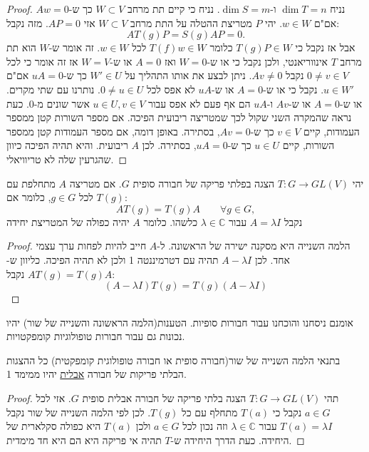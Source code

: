 \documentclass{tstextbook}
\begin{document}
\begin{proof}
נניח \(\dim T=n\) ו-\(\dim S = m\). נניח כי קיים תת מרחב \(W\subset V\) כך ש-\(Aw=0\) אם"ם \(w \in W\). יהי \(P\) מטריצת ההטלה על התת מרחב \(W\subset V\) אזי \(AP=0\). מזה נקבל:
$$A T(g)P=S(g)A P=0.$$
אבל אז נקבל כי \(T(g)P \in W\) כלומר \(T(f)w \in W\) לכל \(w \in W\). זה אומר ש-\(W\) הוא תת מרחב \(T\) אינווריאנטי, ולכן נקבל כי או ש-\(W=0\) ואז \(A=0\) או ש-\(W=V\) אז זה אומר כי לכל \(0 \neq v \in V\) נקבל \(Av \neq 0\).
ניתן לבצע את אותו התהליך על \(W' \in U\) כך ש-\(uA=0\) אם"ם \(u \in W'\). נקבל כי או ש-\(A=0\) או ש-\(uA\) לא אפס לכל \(0\neq u \in U\).
נותרנו עם שתי מקרים. או ש-\(A=0\) או ש-\(Av\) ו-\(uA\) הם אף פעם לא אפס עבור \(u\in U, v\in V\) אשר שונים מ-0. כעת נראה שהמקרה השני שקול לכך שמטריצה ריבועית הפיכה. אם מספר השורות קטן ממספר העמודות, קיים \(v \in V\) כך ש-\(Av=0\), בסתירה. באופן דומה, אם מספר העמודות קטן ממספר השורות, קיים \(u \in U\) כך ש-\(uA=0\), בסתירה. לכן \(A\) ריבועית. והיא תהיה הפיכה כיוון שהגרעין שלה לא טריוויאלי.

\end{proof}
\begin{lemma}
יהי \(T:G\to GL(V)\) הצגה בפלתי פריקה של חבורה סופית \(G\). אם מטריצה \(A\) מתחלפת עם \(T(g)\) לכל \(g \in G\), כלומר אם:
$$A T(g)=T(g)A\qquad\forall g\in G,$$
נקבל \(A=\lambda I\) עבור \(\lambda \in \mathbb{C}\) כלשהו. כלומר \(A\) יהיה כפולה של המטריצת יחידה

\end{lemma}
\begin{proof}
הלמה השנייה היא מסקנה ישירה של הראשונה. ל-\(A\) חייב להיות לפחות ערך עצמי אחד. לכן \(A-\lambda I\) תהיה עם דטרמיננטה 1 ולכן לא תהיה הפיכה. כליוון ש-\(AT(g)=T(g)A\) נקבל:
$$(A-\lambda I)T(g)=T(g)(A-\lambda I)$$

\end{proof}
\begin{remark}
אומנם ניסחנו והוכחנו עבור חבורות סופיות. הטענות(הלמה הראשונה והשנייה של שור) יהיו נכונות גם עבור חבורות טופולוגיות קומפקטויות.

\end{remark}
\begin{corollary}
בתנאי הלמה השנייה של שור(חבורה סופית או חבורה טופולוגית קומפקטית) כל ההצגות הבלתי פריקות של חבורה \underline{אבלית} יהיו ממימד 1.

\end{corollary}
\begin{proof}
תהי \(T:G\to GL(V)\) הצגה בלתי פריקה של חבורה אבלית סופית \(G\). אזי לכל \(a \in G\) נקבל כי \(T(a)\) מתחלף עם כל \(T(g)\). לכן לפי הלמה השנייה של שור נקבל \(T(a)=\lambda I\) עבור \(\lambda \in \mathbb{C}\) וזה נכון לכל \(a \in G\) ולכן \(T(a)\) היא כפולה סקלארית של היחידה. כעת הדרך היחידה ש-\(T\) תהיה אי פריקה היא הם היא חד מימדית.

\end{proof}
\end{document}
